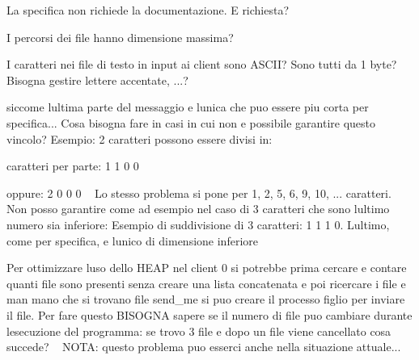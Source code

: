 
\begin{DoxyRefList}
\item[\label{warning__warning000001}%
\Hypertarget{warning__warning000001}%
File \hyperlink{client_8c}{client.c} ]La specifica non richiede la documentazione. E\textquotesingle{} richiesta?

I percorsi dei file hanno dimensione massima?

I caratteri nei file di testo in input ai client sono A\+S\+C\+II? Sono tutti da 1 byte? Bisogna gestire lettere accentate, ...?  
\item[\label{warning__warning000007}%
\Hypertarget{warning__warning000007}%
Globale \hyperlink{client_8h_a54b47b58f228d7bc9827d2919687e25a}{operazioni\+\_\+figlio} (char $\ast$file\+Path)]siccome l\textquotesingle{}ultima parte del messaggio e\textquotesingle{} l\textquotesingle{}unica che puo\textquotesingle{} essere piu\textquotesingle{} corta per specifica... Cosa bisogna fare in casi in cui non e\textquotesingle{} possibile garantire questo vincolo? Esempio\+: 2 caratteri possono essere divisi in\+:
\begin{DoxyItemize}
\item caratteri per parte\+: 1 1 0 0
\item oppure\+: 2 0 0 0 ~\newline
 Lo stesso problema si pone per 1, 2, 5, 6, 9, 10, ... caratteri. ~\newline
 Non posso garantire come ad esempio nel caso di 3 caratteri che sono l\textquotesingle{}ultimo numero sia inferiore\+: Esempio di suddivisione di 3 caratteri\+: 1 1 1 0. L\textquotesingle{}ultimo, come per specifica, e\textquotesingle{} l\textquotesingle{}unico di dimensione inferiore 
\end{DoxyItemize}
\item[\label{warning__warning000004}%
\Hypertarget{warning__warning000004}%
Globale \hyperlink{client_8h_a48d605ff689f470746c858648f0a98c2}{S\+I\+G\+I\+N\+T\+Signal\+Handler} (int sig)]Per ottimizzare l\textquotesingle{}uso dello H\+E\+AP nel client 0 si potrebbe prima cercare e contare quanti file sono presenti senza creare una lista concatenata e poi ricercare i file e man mano che si trovano file send\+\_\+me si puo\textquotesingle{} creare il processo figlio per inviare il file. Per fare questo B\+I\+S\+O\+G\+NA sapere se il numero di file puo\textquotesingle{} cambiare durante l\textquotesingle{}esecuzione del programma\+: se trovo 3 file e dopo un file viene cancellato cosa succede? ~\newline
 N\+O\+TA\+: questo problema puo\textquotesingle{} esserci anche nella situazione attuale...


\end{DoxyRefList}
